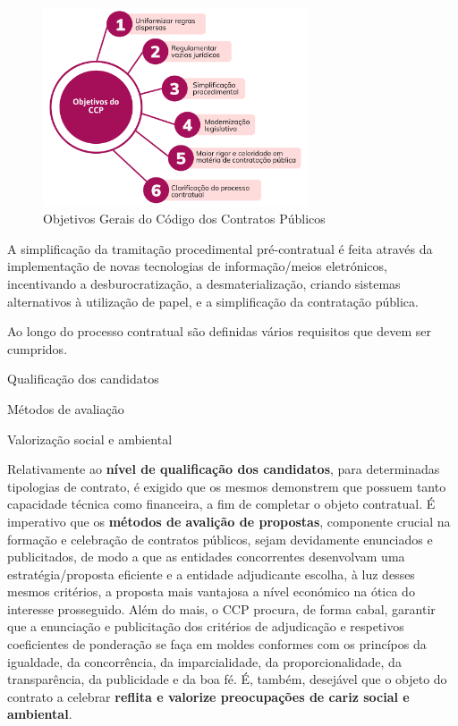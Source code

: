 \begin{figure}[H]
	\centering
	\includegraphics[width=0.7\textwidth]{imagens/ccp_objetivos.png}
	\caption{Objetivos Gerais do Código dos Contratos Públicos}
	\label{fig:ccpgoals}
\end{figure}


A simplificação da tramitação procedimental pré-contratual é feita através da implementação de novas tecnologias de informação/meios eletrónicos, incentivando a desburocratização, a desmaterialização, criando sistemas alternativos à utilização de papel, e a simplificação da contratação pública. 


Ao longo do processo contratual são definidas vários requisitos que devem ser cumpridos.

\begin{my_enumerate}
	\item Qualificação dos candidatos
	\item Métodos de avaliação
	\item Valorização social e ambiental
\end{my_enumerate}

Relativamente ao \textbf{nível de qualificação dos candidatos}, para determinadas tipologias de contrato, é exigido que os mesmos demonstrem que possuem tanto capacidade técnica como financeira, a fim de completar o objeto contratual. 
É imperativo que os \textbf{métodos de avalição de propostas}, componente crucial na formação e celebração de contratos públicos, sejam devidamente enunciados e publicitados, de modo a que as entidades concorrentes desenvolvam uma estratégia/proposta eficiente e a entidade adjudicante escolha, à luz desses mesmos critérios, a proposta mais vantajosa a nível económico na ótica do interesse prosseguido. 
Além do mais, o CCP procura, de forma cabal, garantir que a enunciação e publicitação dos critérios de adjudicação e respetivos coeficientes de ponderação se faça em moldes conformes com os princípos da igualdade, da concorrência, da imparcialidade, da proporcionalidade, da transparência, da publicidade e da boa fé. 
É, também, desejável que o objeto do contrato a celebrar \textbf{reflita e valorize preocupações de cariz social e ambiental}\cite{ccp}. 

